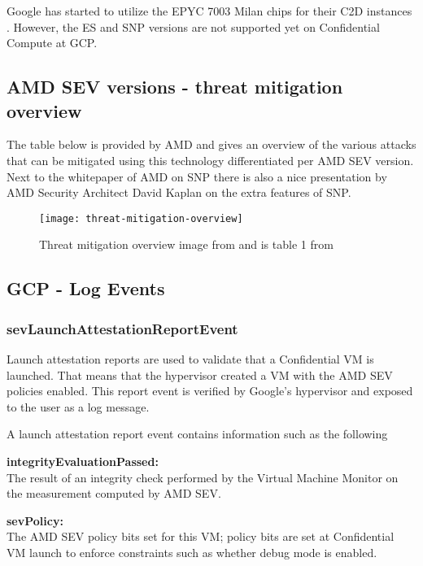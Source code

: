 Google has started to utilize the EPYC 7003 Milan chips 
for their C2D instances \citep{czop_introducing_2022}. 
However, the ES and SNP versions 
are not supported yet on Confidential Compute at GCP. 


\subsection*{AMD SEV versions - threat mitigation overview}
The table below is provided by AMD 
and gives an overview of the various attacks 
that can be mitigated using this technology differentiated per AMD SEV version. 
Next to the whitepaper of AMD on SNP \citep{amd_amd_2020}
there is also a nice presentation by AMD Security Architect 
David Kaplan \citep{kaplan_upcoming_2019} on the extra features of SNP. 

\begin{figure}[!ht]
    \centering
    \texttt{[image: threat-mitigation-overview]}
    \caption{Threat mitigation overview image 
     from \cite{larabel_amd_2022} and is table 1 from \cite{amd_amd_2020}}
    \label{fig:threat-mitigation-overview}
\end{figure}

 

\subsection*{GCP - Log Events}

\subsubsection*{sevLaunchAttestationReportEvent}
Launch attestation reports are used to validate 
that a Confidential VM is launched. 
That means that the hypervisor created a VM 
with the AMD SEV policies enabled. 
This report event is verified by Google’s hypervisor 
and exposed to the user as a log message.

A launch attestation report event contains information such as the following

\textbf{integrityEvaluationPassed: }\\
The result of an integrity check performed by the Virtual Machine Monitor 
on the measurement computed by AMD SEV.

\textbf{sevPolicy: }\\
The AMD SEV policy bits set for this VM; 
policy bits are set at Confidential VM launch to enforce constraints such as whether debug mode is enabled.

